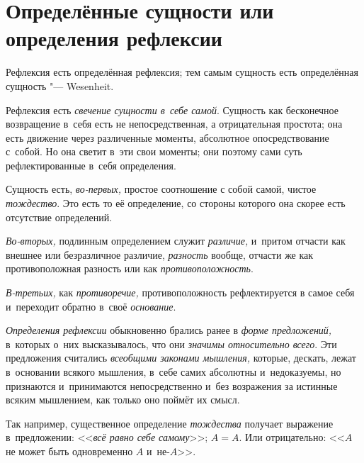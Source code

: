 \section{Определённые сущности или определения рефлексии}

Рефлексия есть определённая рефлексия; тем самым
сущность есть определённая сущность "--- Wesenheit.

Рефлексия есть {\em свечение сущности в~себе самой}.
Сущность как бесконечное возвращение в~себя есть не непосредственная, а
отрицательная простота; она есть движение через различенные моменты,
абсолютное опосредствование с~собой. Но она светит в~эти свои моменты; они
поэтому сами суть рефлектированные в~себя определения.

Сущность есть, {\em во-первых,} простое соотношение с
собой самой, чистое {\em тождество}. Это есть то её
определение, со стороны которого она скорее есть отсутствие определений.

{\em Во-вторых,} подлинным определением служит {\em различие,} и~притом
отчасти как внешнее или безразличное различие, {\em разность} вообще,
отчасти же как противоположная разность или как {\em противоположность}.

{\em В-третьих,} как {\em противоречие,} противоположность рефлектируется в
самое себя и~переходит обратно в~своё {\em основание}.


{\em Определения рефлексии} обыкновенно брались ранее в
{\em форме предложений,} в~которых о~них высказывалось,
что они {\em значимы относительно всего}. Эти
предложения считались {\em всеобщими законами
мышления,} которые, дескать, лежат в~основании всякого мышления, в~себе
самих абсолютны и~недоказуемы, но признаются и~принимаются непосредственно
и~без возражения за истинные всяким мышлением, как только оно поймёт их смысл.

Так например, существенное определение {\em тождества}
получает выражение в~предложении: <<{\em всё равно себе
самому}>>; $A=A$. Или отрицательно: <<$A$ не может
быть одновременно $A$ и~не-$A$>>.

